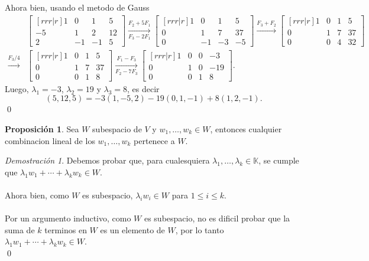\documentclass{article}
\theoremstyle{definition}
\theoremstyle{definition}
\newtheorem{prop}[teo]{Proposición}
\theoremstyle{remark}
\newtheorem*{demo}{Demostración}
\begin{document}
  Ahora bien, usando el metodo de Gauss \[
    \begin{aligned}
  &\begin{bmatrix}[rrr|r]
    1 & 0 & 1 & 5 \\
    -5 & 1 & 2 & 12 \\
    2 & -1 & -1 & 5 
  \end{bmatrix}\underset{F_3-2F_1}{\xrightarrow{F_2+5F_1}} \begin{bmatrix}[rrr|r]
    1 & 0 & 1 & 5 \\
    0 & 1 & 7 & 37 \\
    0 & -1 & -3 & -5 
    \end{bmatrix}\xrightarrow{F_3+F_2} \begin{bmatrix}[rrr|r]
    1 & 0 & 1 & 5 \\
    0 & 1 & 7 & 37 \\
  0 & 0 & 4 & 32 \end{bmatrix} \\ 
      \xrightarrow{F_3 / 4 } & \begin{bmatrix}[rrr|r] 
        1 & 0 & 1 & 5 \\ 0 & 1 & 7 & 37 \\ 
        0& 0 & 1 & 8 \end{bmatrix} \underset{F_2-7F_3}{\xrightarrow{F_1-F_3}} \begin{bmatrix}[rrr|r]1 & 0 & 0 & -3 \\ 0 & 1 & 0 & -19 \\ 0 & 0 & 1 & 8  \end{bmatrix}.
\end{aligned}
\]
Luego, $\lambda_1=-3$, $\lambda_2=19$ y $\lambda_3=8$, es decir \[
  (5,12,5)=-3(1,-5,2)-19(0,1,-1)+8(1,2,-1).
\]
\qed
\begin{prop}
  Sea $W$ subespacio de $V$ y $w_1, \dots ,w_k \in W$, entonces cualquier combinacion lineal de los $w_1, \dots ,w_k$ pertenece a $W$.
\end{prop}
\begin{demo}
  Debemos probar que, para cualesquiera $\lambda_1 , \dots ,\lambda_k \in \mathbb{K}$, se cumple que $\lambda_1 w_1 + \cdots + \lambda_k w_k \in W$. \\\\ Ahora bien, como $W$ es subespacio, $\lambda_i w_i \in W$ para $1 \leq i \leq k$. \\\\ Por un argumento inductivo, como $W$ es subespacio, no es dificil probar que la suma de $k$ terminos en $W$ es un elemento de $W$, por lo tanto \\$\lambda_1 w_1 + \cdots + \lambda_k w_k \in W$. \\  \qed
\end{demo}
\end{document}
